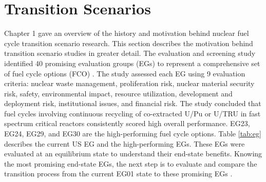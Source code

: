 \section{Transition Scenarios}
Chapter 1 gave an overview of the history and motivation behind
nuclear fuel cycle transition scenario research.
This section describes the motivation behind transition 
scenario studies in greater detail.
The evaluation and screening study identified 40 promising 
evaluation groups (\glspl{EG}) to represent a comprehensive set of 
fuel cycle options (\gls{FCO}) \cite{wigeland_nuclear_2014}. 
The study assessed each EG using 
9 evaluation criteria: nuclear waste management, 
proliferation risk, nuclear material security risk, 
safety, environmental impact, resource utilization, 
development and deployment risk, institutional issues, and 
financial risk.  
The study concluded that fuel cycles
involving continuous recycling of co-extracted U/Pu or U/TRU in 
fast spectrum critical reactors consistently scored high overall 
performance.
EG23, EG24, EG29, and EG30 are the high-performing fuel cycle options.
Table \ref{tab:eg} describes the current US EG
and the high-performing \glspl{EG}. 
These \glspl{EG} were evaluated at an equilibrium state to 
understand their end-state benefits.
Knowing the most promising end-state \glspl{EG}, 
the next step is to evaluate and compare the transition process 
from the current EG01 
state to these promising \glspl{EG} \cite{feng_standardized_2016}. 

